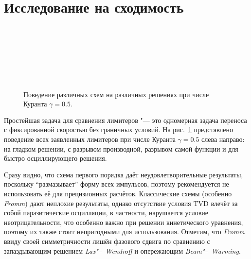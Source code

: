 \documentclass[a4paper,10pt]{article}
\begin{document}
\section{Исследование на сходимость}
\begin{figure}
	\\
	\\
	\\
	\\
	\\
	\\
	\centering{}
	\caption{Поведение различных схем на различных решениях при числе Куранта \(\gamma=0.5\).}\label{fig:conver}
\end{figure}

Простейшая задача для сравнения лимитеров "--- это одномерная задача переноса с фиксированной скоростью без граничных условий.
На рис.~\ref{fig:conver} представлено поведение всех заявленных лимитеров при числе Куранта \(\gamma=0.5\) слева направо:
на гладком решении, с разрывом производной, разрывом самой функции и для быстро осциллирующего решения.

Сразу видно, что схема первого порядка даёт неудовлетворительные результаты, поскольку ``размазывает'' форму всех импульсов,
поэтому рекомендуется не использовать её для прецизионных расчётов.
Классические схемы (особенно \textit{Fromm}) дают неплохие результаты, однако отсутствие условия TVD влечёт за собой паразитические осцилляции,
в частности, нарушается условие неотрицательности, что особенно важно при решении кинетического уравнения,
поэтому их также стоит непригодными для использования. Отметим, что \textit{Fromm} ввиду своей симметричности лишён фазового сдвига
по сравнению с запаздывающим решением \textit{Lax"--~Wendroff} и опережающим \textit{Beam"--~Warming}.
\end{document}
